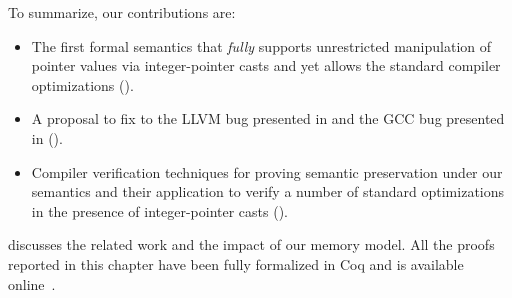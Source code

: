 




\medskip \noindent
To summarize, our contributions are:
\begin{itemize}
\item The first formal semantics that \emph{fully} supports unrestricted manipulation of pointer
  values via integer-pointer casts and yet allows the standard compiler optimizations
  ().

\item A proposal to fix to the LLVM bug presented in  and the GCC bug
  presented in  ().

\item Compiler verification techniques for proving semantic preservation under our semantics and
  their application to verify a number of standard optimizations in the presence of integer-pointer
  casts ().
\end{itemize}

\noindent {} discusses the related work and the impact of our memory
model.  All the proofs reported in this chapter have been fully formalized in Coq and is available
online~\cite{kang-phd-thesis-web}.

%
%
%
%


